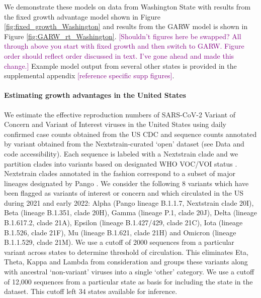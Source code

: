 \documentclass[11pt,oneside,letterpaper]{article}
\def\tbc#1{\textcolor{purple}{[#1]}}
\begin{document}
We demonstrate these models on data from Washington State with results from the fixed growth advantage model shown in Figure \ref{fig:fixed_growth_Washington} and results from the GARW model is shown in Figure \ref{fig:GARW_rt_Washington}.
\tbc{Shouldn't figures here be swapped? All through above you start with fixed growth and then switch to GARW. Figure order should reflect order discussed in text. I've gone ahead and made this change.}
Example model output from several other states is provided in the supplemental appendix \tbc{reference specific supp figures}.

\paragraph{Estimating growth advantages in the United States}

We estimate the effective reproduction numbers of SARS-CoV-2 Variant of Concern and Variant of Interest viruses in the United States using daily confirmed case counts obtained from the US CDC and sequence counts annotated by variant obtained from the Nextstrain-curated `open' dataset \cite{Hadfield2018} (see Data and code accessibility).
Each sequence is labeled with a Nextstrain clade \cite{Hadfield2018} and we partition clades into variants based on designated WHO VOC/VOI status \cite{Konings2021}.
Nextstrain clades annotated in the fashion correspond to a subset of major lineages designated by Pango \cite{Rambaut2020}.
We consider the following 8 variants which have been flagged as variants of interest or concern and which circulated in the US during 2021 and early 2022: Alpha (Pango lineage B.1.1.7, Nextstrain clade 20I), Beta (lineage B.1.351, clade 20H), Gamma (lineage P.1, clade 20J), Delta (lineage B.1.617.2, clade 21A), Epsilon (lineage B.1.427/429, clade 21C), Iota (lineage B.1.526, clade 21F), Mu (lineage B.1.621, clade 21H) and Omicron (lineage B.1.1.529, clade 21M).
We use a cutoff of 2000 sequences from a particular variant across states to determine threshold of circulation.
This eliminates Eta, Theta, Kappa and Lambda from consideration and groups these variants along with ancestral `non-variant' viruses into a single `other' category.
We use a cutoff of 12,000 sequences from a particular state as basis for including the state in the dataset.
This cutoff left 34 states available for inference.
\end{document}
